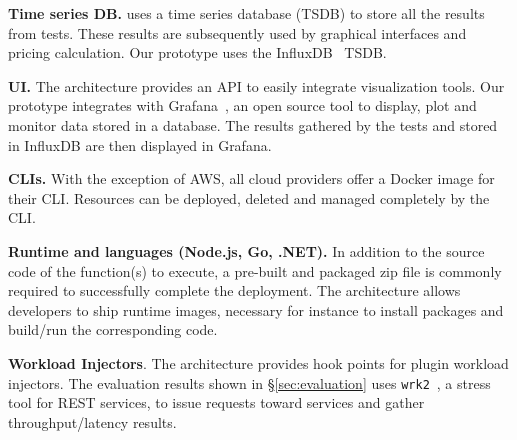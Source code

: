 \textbf{Time series DB.}
\sys uses a time series database (\gls{TSDB}) to store all the results from tests.
These results are subsequently used by graphical interfaces and pricing calculation.
Our prototype uses the InfluxDB~\cite{influx} \gls{TSDB}.

\textbf{UI.}
The \sys architecture provides an API to easily integrate visualization tools.
Our prototype integrates with Grafana~\cite{grafana}, an open source tool to display, plot and monitor data stored in a database. 
The results gathered by the tests and stored in InfluxDB are then displayed in Grafana.

\textbf{CLIs.}
With the exception of AWS, all cloud providers offer a Docker image for their \gls{CLI}. 
Resources can be deployed, deleted and managed completely by the \gls{CLI}.

\textbf{Runtime and languages (Node.js, Go, .NET).}
In addition to the source code of the function(s) to execute, a pre-built and packaged zip file is commonly required to successfully complete the deployment. 
The \sys architecture allows developers to ship runtime images, necessary for instance to install packages and build/run the corresponding code.


\textbf{Workload Injectors}.
The \sys architecture provides hook points for plugin workload injectors.
The evaluation results shown in \S\ref{sec:evaluation} uses \texttt{wrk2}~\cite{wrk2}, a stress tool for REST services, to issue requests toward services and gather throughput/latency results.

